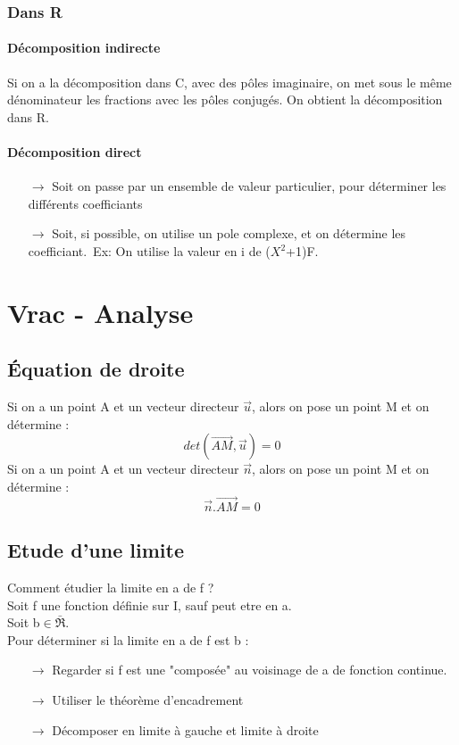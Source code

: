 \documentclass[a4paper,12 pt,oneside]{report}     %
\begin{document}
\subsection{Dans R}
\subsubsection{Décomposition indirecte}
Si on a la décomposition dans C, avec des pôles imaginaire, on met sous le même dénominateur les fractions avec les pôles conjugés. On obtient la décomposition dans R.
\subsubsection{Décomposition direct}
\begin{itemize}
 \item[$\rightarrow$] Soit on passe par un ensemble de valeur particulier, pour déterminer les différents coefficiants
 \item[$\rightarrow$] Soit, si possible, on utilise un pole complexe, et on détermine les coefficiant.\ Ex: On utilise la valeur en i de ($X^2$+1)F.
\end{itemize}
\chapter{Vrac - Analyse}
\section{Équation de droite}
Si on a un point A et un vecteur directeur $\overrightarrow{u}$, alors on pose un point M et on détermine :
$$det(\overrightarrow{AM},\overrightarrow{u}) = 0$$
Si on a un point A et un vecteur directeur $\overrightarrow{n}$, alors on pose un point M et on détermine :
$$\overrightarrow{n}.\overrightarrow{AM}=0$$ 
\section{Etude d'une limite}
Comment étudier la limite en a de f ?\\
Soit f une fonction définie sur I, sauf peut etre en a.\\
Soit b$\in \bar{\Re}$.\\
Pour déterminer si la limite en a de f est b : 
\begin{itemize}
 \item[$\rightarrow$] Regarder si f est une "composée" au voisinage de a de fonction continue.
 \item[$\rightarrow$] Utiliser le théorème d'encadrement
 \item[$\rightarrow$] Décomposer en limite à gauche et limite à droite
\end{itemize}
\end{document}
